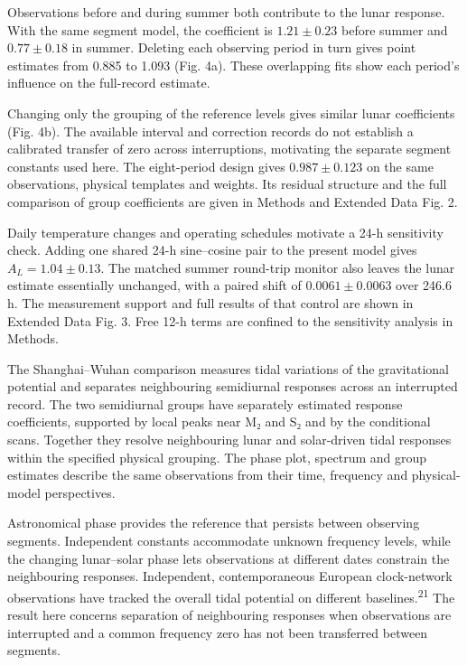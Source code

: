 \documentclass[
  12pt,
  a4paper,
]{article}
\begin{document}
Observations before and during summer both contribute to the lunar
response. With the same segment model, the coefficient is
\(1.21\pm0.23\) before summer and \(0.77\pm0.18\) in summer. Deleting
each observing period in turn gives point estimates from 0.885 to 1.093
(Fig. 4a). These overlapping fits show each period's influence on the
full-record estimate.

Changing only the grouping of the reference levels gives similar lunar
coefficients (Fig. 4b). The available interval and correction records do
not establish a calibrated transfer of zero across interruptions,
motivating the separate segment constants used here. The eight-period
design gives \(0.987\pm0.123\) on the same observations, physical
templates and weights. Its residual structure and the full comparison of
group coefficients are given in Methods and Extended Data Fig. 2.

Daily temperature changes and operating schedules motivate a 24-h
sensitivity check. Adding one shared 24-h sine--cosine pair to the
present model gives \(A_L=1.04\pm0.13\). The matched summer round-trip
monitor also leaves the lunar estimate essentially unchanged, with a
paired shift of \(0.0061\pm0.0063\) over 246.6 h. The measurement
support and full results of that control are shown in Extended Data Fig.
3. Free 12-h terms are confined to the sensitivity analysis in Methods.

The Shanghai--Wuhan comparison measures tidal variations of the
gravitational potential and separates neighbouring semidiurnal responses
across an interrupted record. The two semidiurnal groups have separately
estimated response coefficients, supported by local peaks near M₂ and S₂
and by the conditional scans. Together they resolve neighbouring lunar
and solar-driven tidal responses within the specified physical grouping.
The phase plot, spectrum and group estimates describe the same
observations from their time, frequency and physical-model perspectives.

Astronomical phase provides the reference that persists between
observing segments. Independent constants accommodate unknown frequency
levels, while the changing lunar--solar phase lets observations at
different dates constrain the neighbouring responses. Independent,
contemporaneous European clock-network observations have tracked the
overall tidal potential on different baselines.\textsuperscript{21} The
result here concerns separation of neighbouring responses when
observations are interrupted and a common frequency zero has not been
transferred between segments.
\end{document}
